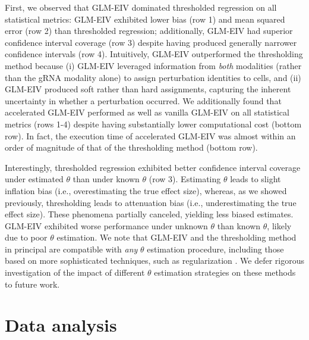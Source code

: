 \documentclass[12pt]{article}
\begin{document}
First, we observed that GLM-EIV dominated thresholded regression on all statistical metrics: GLM-EIV exhibited lower bias (row 1) and mean squared error (row 2) than thresholded regression; additionally, GLM-EIV had superior confidence interval coverage (row 3) despite having produced generally narrower confidence intervals (row 4). Intuitively, GLM-EIV outperformed the thresholding method because (i) GLM-EIV leveraged information from \textit{both} modalities (rather than the gRNA modality alone) to assign perturbation identities to cells, and (ii) GLM-EIV produced soft rather than hard assignments, capturing the inherent uncertainty in whether a perturbation occurred. We additionally found that accelerated GLM-EIV performed as well as vanilla GLM-EIV on all statistical metrics (rows 1-4) despite having substantially lower computational cost (bottom row). In fact, the execution time of accelerated GLM-EIV was almost within an order of magnitude of that of the thresholding method (bottom row).

Interestingly, thresholded regression exhibited better confidence interval coverage under estimated $\theta$ than under known $\theta$ (row 3). Estimating $\theta$ leads to slight inflation bias (i.e., overestimating the true effect size), whereas, as we showed previously, thresholding leads to attenuation bias (i.e., underestimating the true effect size). These phenomena partially canceled, yielding less biased estimates. GLM-EIV exhibited worse performance under unknown $\theta$ than known $\theta$, likely due to poor $\theta$ estimation. We note that GLM-EIV and the thresholding method in principal are compatible with \textit{any} $\theta$ estimation procedure, including those based on more sophisticated techniques, such as regularization \parencite{Hafemeister2019}. We defer rigorous investigation of the impact of different $\theta$ estimation strategies on these methods to future work.

\section{Data analysis}
\end{document}
